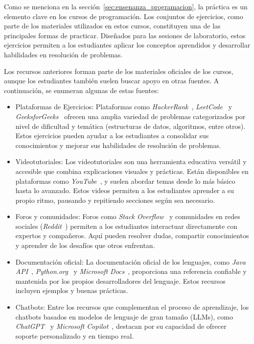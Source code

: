 Como se menciona en la sección~\ref{sec:ensenanza_programacion}, la práctica es un elemento clave en los cursos de programación. Los conjuntos de ejercicios, como parte de los materiales utilizados en estos cursos, constituyen una de las principales formas de practicar. Diseñados para las sesiones de laboratorio, estos ejercicios permiten a los estudiantes aplicar los conceptos aprendidos y desarrollar habilidades en resolución de problemas.

Los recursos anteriores forman parte de los materiales oficiales de los cursos, aunque los estudiantes también suelen buscar apoyo en otras fuentes. A continuación, se enumeran algunas de estas fuentes:

\begin{itemize}
    \item Plataformas de Ejercicios: 
    Plataformas como \textit{HackerRank}~\cite{hackerrank}, \textit{LeetCode}~\cite{leetcode}  y \textit{GeeksforGeeks}~\cite{geeksforgeeks} ofrecen una amplia variedad de problemas categorizados por nivel de dificultad y temática (estructuras de datos, algoritmos, entre otros). Estos ejercicios pueden ayudar a los estudiantes a consolidar sus conocimientos y mejorar sus habilidades de resolución de problemas.

    \item Videotutoriales:
    Los videotutoriales son una herramienta educativa versátil y accesible que combina explicaciones visuales y prácticas. Están disponibles en plataformas como \textit{YouTube}~\cite{youtube}, y suelen abordar temas desde lo más básico hasta lo avanzado. Estos videos permiten a los estudiantes aprender a su propio ritmo, pausando y repitiendo secciones según sea necesario.

    \item Foros y comunidades: 
    Foros como \textit{Stack Overflow}~\cite{stackoverflow} y comunidades en redes sociales (\textit{Reddit}~\cite{reddit}) permiten a los estudiantes interactuar directamente con expertos y compañeros. Aquí pueden resolver dudas, compartir conocimientos y aprender de los desafíos que otros enfrentan.
    
    \item Documentación oficial:
    La documentación oficial de los lenguajes, como  \textit{Java API}~\cite{java-api}, \textit{Python.org}~\cite{python} y \textit{Microsoft Docs}~\cite{microsoft-docs}, proporciona una referencia confiable y mantenida por los propios desarrolladores del lenguaje. Estos recursos incluyen ejemplos y buenas prácticas.
    
    \item Chatbots: 
    Entre los recursos que complementan el proceso de aprendizaje, los chatbots basados en modelos de lenguaje de gran tamaño (LLMs), como \textit{ChatGPT}~\cite{chatgpt} y \textit{Microsoft Copilot}~\cite{copilot}, destacan por su capacidad de ofrecer soporte personalizado y en tiempo real.
\end{itemize}

